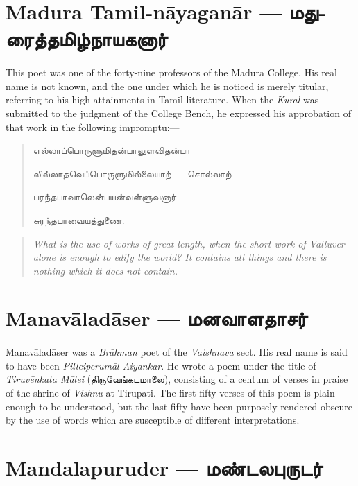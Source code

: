 \documentclass{article}
\newcommand{\TamilText}[1]{\texttamil{#1}}
\newcommand{\TamilBold}[1]{\texttamil{\textbf{#1}}}
\newcommand{\tam}[1]{\TamilText{#1}}
\newcommand{\tambold}[1]{\TamilBold{#1}}
\begin{document}
\section{Madura Tamil-n\={a}yagan\={a}r --- \tambold{மதுரைத்தமிழ்நாயகனார்}}
\paragraph{}
This poet was one of the forty-nine professors of the Madura College. His real name is not known, and the one under which he is noticed is merely titular, referring to his high attainments in Tamil literature. When the \emph{Kural} was submitted to the judgment of the College Bench, he expressed his approbation of that work in the following impromptu:---
\begin{quotation}\small
\tam{எல்லாப்பொருளுமிதன்பாலுளவிதன்பா}

\tam{லில்லாதவெப்பொருளுமில்லையாற்‌} --- \tam{சொல்லாற்}

\tam{பரந்தபாவாலென்பயன்வள்ளுவனார்‌}

\tam{சுரந்தபாவையத்துணை}.
\end{quotation}
\begin{quotation}\small
\emph{What is the use of works of great length, when the short work of Valluver alone is enough to edify the world? It contains all things and there is nothing which it does not contain.}
\end{quotation}

\section{Manav\={a}lad\={a}ser --- \tambold{மனவாளதாசர்}}
\paragraph{}
Manav\={a}lad\={a}ser was a \emph{Br\={a}hman} poet of the \emph{Vaishnava} sect. His real name is said to have been \emph{Pilleiperum\={a}l Aiyankar}. He wrote a poem under the title of \emph{Tiruv\={e}nkata M\={a}lei} (\tam{திருவேங்கடமாலை}), consisting of a centum of verses in praise of the shrine of \emph{Vishnu} at Tirupati. The first fifty verses of this poem is plain enough to be understood, but the last fifty have been purposely rendered obscure by the use of words which are susceptible of different interpretations.

\section{Mandalapuruder --- \tambold{மண்டலபுருடர்}}
\end{document}

